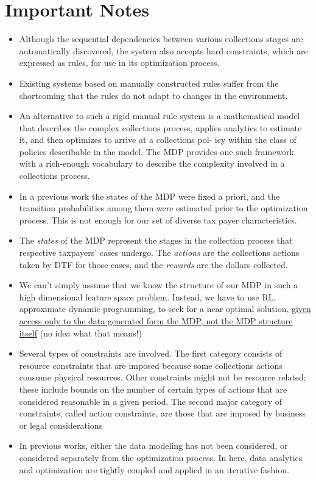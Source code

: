 \documentclass{article}
\theoremstyle{remark}
\theoremstyle{remark}
\theoremstyle{remark}
\theoremstyle{remark}
\theoremstyle{remark}
\theoremstyle{remark}
\begin{document}
\section{Important Notes}
\begin{itemize}
	\item Although the sequential dependencies between various collections stages are automatically discovered, the system also accepts hard constraints, which are expressed as rules, for use in its optimization process.
	\item Existing systems based on manually constructed rules suffer from the shortcoming that the rules do not adapt to changes in the environment.
	\item An alternative to such a rigid manual rule system is a mathematical model that describes the complex collections process, applies analytics to estimate it, and then optimizes to arrive at a collections pol- icy within the class of policies describable in the model. The MDP provides one such framework with a rich-enough vocabulary to describe the complexity involved in a collections process.
	\item In a previous work the states of the MDP were fixed a priori, and the transition probabilities among them were estimated prior to the optimization process. This is not enough for our set of diverse tax payer characteristics.
	\item The \emph{states} of the MDP represent the stages in the collection process that respective taxpayers’ cases undergo. The \emph{actions} are the collections actions taken by DTF for those cases, and the \emph{rewards} are the dollars collected.
	\item We can't simply assume that we know the structure of our MDP in such a high dimensional feature space problem. Instead, we have to use RL, approximate dynamic programming, to seek for a near optimal solution, \underline{given access only to the data generated form the MDP, not the MDP structure itself} (no idea what that means!)
	\item Several types of constraints are involved. The first category consists of resource constraints that are imposed because some collections actions consume physical resources. Other constraints might not be resource related; these include bounds on the number of certain types of actions that are considered reasonable in a given period. The second major category of constraints, called action constraints, are those that are imposed by business or legal considerations
	\item In previous works, either the data modeling has not been considered, or considered separately from the optimization process. In here, data analytics and optimization are tightly coupled and applied in an iterative fashion.

\end{itemize}
\end{document}
